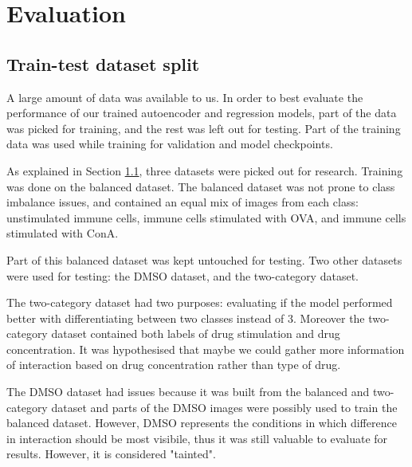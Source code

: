 
\chapter{Evaluation} 

\section{Train-test dataset split}

A large amount of data was available to us. In order to best evaluate the performance of our trained autoencoder and regression models, part of the data was picked for training, and the rest was left out for testing. Part of the training data was used while training for validation and model checkpoints.

As explained in Section \ref{}, three datasets were picked out for research. Training was done on the balanced dataset. The balanced dataset was not prone to class imbalance issues, and contained an equal mix of images from each class: unstimulated immune cells, immune cells stimulated with OVA, and immune cells stimulated with ConA.  

Part of this balanced dataset was kept untouched for testing. Two other datasets were used for testing: the DMSO dataset, and the two-category dataset. 

The two-category dataset had two purposes: evaluating if the model performed better with differentiating between two classes instead of 3. Moreover the two-category dataset contained both labels of drug stimulation and drug concentration. It was hypothesised that maybe we could gather more information of interaction based on drug concentration rather than type of drug. 

The DMSO dataset had issues because it was built from the balanced and two-category dataset and parts of the DMSO images were possibly used to train the balanced dataset. However, DMSO represents the conditions in which difference in interaction should be most visibile, thus it was still valuable to evaluate for results. However, it is considered "tainted". 


